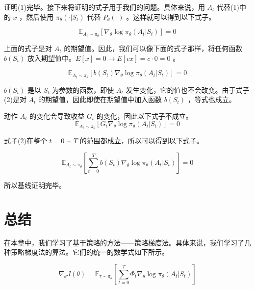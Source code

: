 \documentclass[lang=cn,newtx,10pt,scheme=chinese]{elegantbook}
\begin{document}
证明(1)完毕。接下来将证明的式子用于我们的问题。具体来说，用 $A_t$ 代替(1)中的 $x$ ，然后使用 $\pi_\theta(\cdot|S_t)$ 代替 $P_\theta(\cdot)$ 。这样就可以得到以下式子。

\begin{equation}
\mathbb{E}_{A_t\sim\pi_\theta}\left\lbrack{\nabla_\theta\log\pi_\theta(A_t|S_t)}\right\rbrack = 0
\end{equation}

上面的式子是对 $A_t$ 的期望值。因此，我们可以像下面的式子那样，将任何函数 $b(S_t)$ 放入期望值中。$E[x]=0\to E[cx]=c\cdot 0=0$ 。

\begin{equation}
\mathbb{E}_{A_t\sim\pi_\theta}\left\lbrack{b(S_t)\nabla_\theta\log\pi_\theta(A_t|S_t)}\right\rbrack = 0
\end{equation}

$b(S_t)$ 是以 $S_t$ 为参数的函数，即使 $A_t$ 发生变化，它的值也不会改变。由于式子(2)是对 $A_t$ 的期望值，因此即使在期望值中加入函数 $b(S_t)$ ，等式也成立。

\begin{marker}
动作 $A_t$ 的变化会导致收益 $G_t$ 的变化，因此以下式子不成立。
\begin{equation*}
\mathbb{E}_{A_t\sim\pi_\theta}\left\lbrack{G_t\nabla_\theta\log\pi_\theta(A_t|S_t)}\right\rbrack = 0
\end{equation*}
\end{marker}

式子(2)在整个 $t=0\sim T$ 的范围都成立，所以可以得到以下式子。

\begin{equation}
\mathbb{E}_{A_t\sim\pi_\theta}\left\lbrack{\sum_{t=0}^Tb(S_t)\nabla_\theta\log\pi_\theta(A_t|S_t)}\right\rbrack = 0
\end{equation}

所以基线证明完毕。

\section{总结}

在本章中，我们学习了基于策略的方法——策略梯度法。具体来说，我们学习了几种策略梯度法的算法。它们的统一的数学式如下所示。

\begin{equation}
\nabla_\theta J(\theta)=\mathbb{E}_{\tau\sim\pi_\theta}\left\lbrack{\sum_{t=0}^T\Phi_t\nabla_\theta\log\pi_\theta(A_t|S_t)}\right\rbrack
\end{equation}
\end{document}
